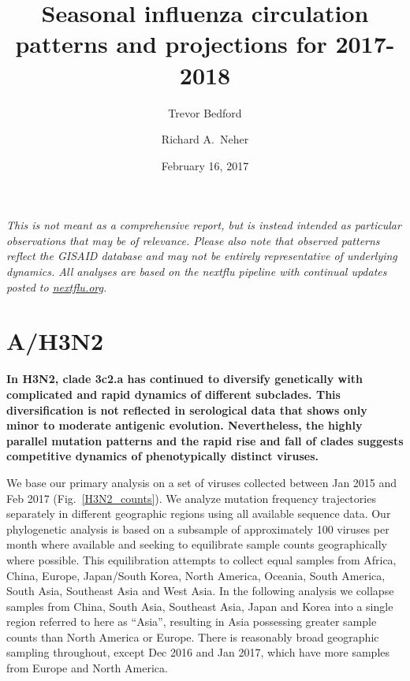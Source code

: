 \documentclass[11pt,oneside,letterpaper]{article}
\title{\vspace{2cm} \LARGE \bf
Seasonal influenza circulation patterns and projections for 2017-2018
}
\author[1]{Trevor Bedford}
\author[2]{Richard A.\ Neher}
\affil[1]{Vaccine and Infectious Disease Division, Fred Hutchinson Cancer Research Center, Seattle, WA, USA}
\affil[2]{Biozentrum, University of Basel, Basel, Switzerland}
\date{February 16, 2017}
\begin{document}
\maketitle

\textit{This is not meant as a comprehensive report, but is instead intended as particular observations that may be of relevance. Please also note that observed patterns reflect the GISAID database and may not be entirely representative of underlying dynamics. All analyses are based on the nextflu pipeline \cite{neher2015nextflu} with continual updates posted to \href{http://nextflu.org}{nextflu.org}.}

\tableofcontents

\pagebreak

\section*{A/H3N2}

\textbf{In H3N2, clade 3c2.a has continued to diversify genetically with complicated and rapid dynamics of different subclades.
This diversification is not reflected in serological data that shows only minor to moderate antigenic evolution.
Nevertheless, the highly parallel mutation patterns and the rapid rise and fall of clades suggests competitive dynamics of phenotypically distinct viruses.}

We base our primary analysis on a set of viruses collected between Jan 2015 and Feb 2017 (Fig.\ \ref{H3N2_counts}).
We analyze mutation frequency trajectories separately in different geographic regions using all available sequence data.
Our phylogenetic analysis is based on a subsample of approximately 100 viruses per month where available and seeking to equilibrate sample counts geographically where possible.
This equilibration attempts to collect equal samples from Africa, China, Europe, Japan/South Korea, North America, Oceania, South America, South Asia, Southeast Asia and West Asia.
In the following analysis we collapse samples from China, South Asia, Southeast Asia, Japan and Korea into a single region referred to here as ``Asia'', resulting in Asia possessing greater sample counts than North America or Europe.
There is reasonably broad geographic sampling throughout, except Dec 2016 and Jan 2017, which have more samples from Europe and North America.
\end{document}
